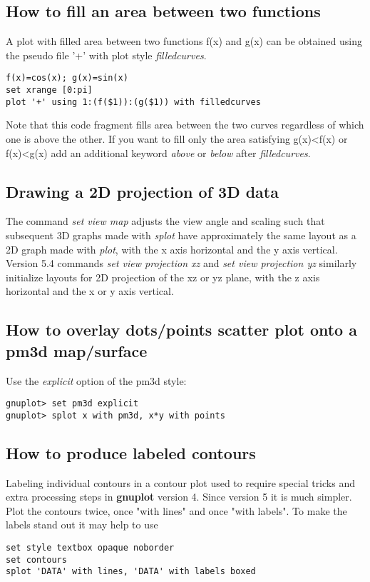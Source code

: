 \documentclass[letter,11pt]{article}
\newcommand{\gnuplot}{\textbf{gnuplot }}
\begin{document}
{\subsection{How to fill an area between two functions}

A plot with filled area between two functions f(x) and g(x) can be obtained using
the pseudo file '+' with  plot style {\em filledcurves}.
\small
\begin{verbatim}
f(x)=cos(x); g(x)=sin(x)
set xrange [0:pi]
plot '+' using 1:(f($1)):(g($1)) with filledcurves
\end{verbatim}
\normalsize

Note that this code fragment fills area between the two curves regardless of
which one is above the other.  If you want to fill only the area satisfying g(x)<f(x)
or f(x)<g(x)
add an additional keyword {\em above} or {\em below} after {\em filledcurves}.



\subsection{Drawing a 2D projection of 3D data}

The command {\em set view map} adjusts the view angle and scaling such
that subsequent 3D graphs made with {\em splot} have approximately the same layout
as a 2D graph made with {\em plot}, with the x axis horizontal and the y axis vertical.
Version 5.4 commands {\em set view projection xz} and {\em set view projection yz}
similarly initialize layouts for 2D projection of the xz or yz plane, with the
z axis horizontal and the x or y axis vertical.

\subsection{How to overlay dots/points scatter plot onto a pm3d map/surface}

Use the {\em explicit} option of the pm3d style:
\small
\begin{verbatim}
gnuplot> set pm3d explicit
gnuplot> splot x with pm3d, x*y with points
\end{verbatim}
\normalsize


\subsection{How to produce labeled contours}

Labeling individual contours in a contour plot used to require special
tricks and extra processing steps in \gnuplot version 4.
Since version 5 it is much simpler.  Plot the contours twice,
once "with lines" and once "with labels".  To make the labels stand out
it may help to use
\begin{verbatim}
set style textbox opaque noborder
set contours
splot 'DATA' with lines, 'DATA' with labels boxed
\end{verbatim}

}
\end{document}
